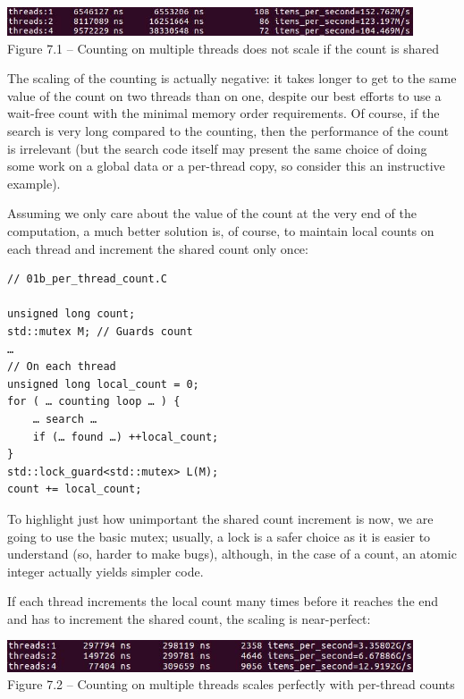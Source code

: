 \begin{center}
\includegraphics[width=0.9\textwidth]{content/2/chapter7/images/1.jpg}\\
Figure 7.1 – Counting on multiple threads does not scale if the count is shared
\end{center}

The scaling of the counting is actually negative: it takes longer to get to the same value of the count on two threads than on one, despite our best efforts to use a wait-free count with the minimal memory order requirements. Of course, if the search is very long compared to the counting, then the performance of the count is irrelevant (but the search code itself may present the same choice of doing some work on a global data or a per-thread copy, so consider this an instructive example).

Assuming we only care about the value of the count at the very end of the computation, a much better solution is, of course, to maintain local counts on each thread and increment the shared count only once:

\begin{lstlisting}[style=styleCXX]
// 01b_per_thread_count.C

unsigned long count;
std::mutex M; // Guards count
…
// On each thread
unsigned long local_count = 0;
for ( … counting loop … ) {
	… search …
	if (… found …) ++local_count;
}
std::lock_guard<std::mutex> L(M);
count += local_count;
\end{lstlisting}

To highlight just how unimportant the shared count increment is now, we are going to use the basic mutex; usually, a lock is a safer choice as it is easier to understand (so, harder to make bugs), although, in the case of a count, an atomic integer actually yields simpler code.

If each thread increments the local count many times before it reaches the end and has to increment the shared count, the scaling is near-perfect:

\begin{center}
\includegraphics[width=0.9\textwidth]{content/2/chapter7/images/2.jpg}\\
Figure 7.2 – Counting on multiple threads scales perfectly with per-thread counts
\end{center}

